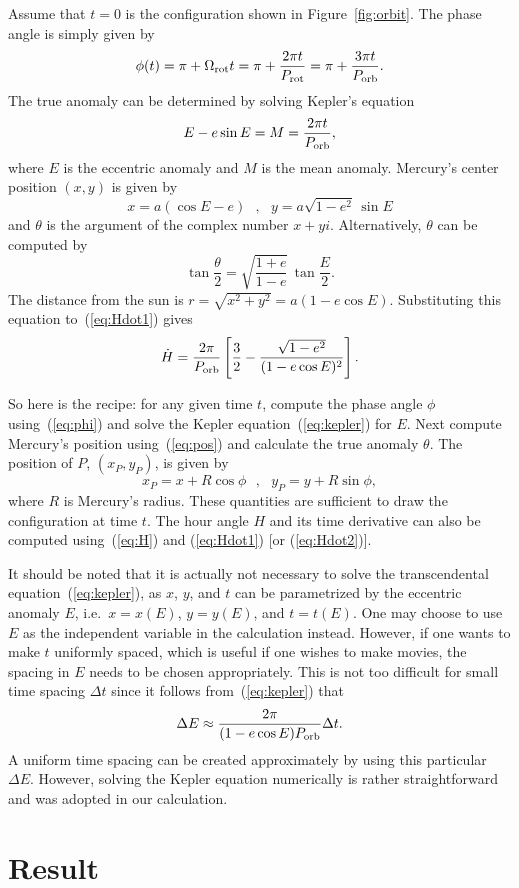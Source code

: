 \documentclass[12pt]{article}
\newcommand \beq {\begin{equation}}
\newcommand \eeq {\end{equation}}
\newcommand{\prot}{P_{\rm rot}}
\newcommand{\porb}{P_{\rm orb}}
\begin{document}
Assume that $t=0$ is the configuration shown in Figure~\ref{fig:orbit}. 
The phase angle is simply given by 
\beq
  \phi(t) = \pi + \Omega_{\rm rot} t = \pi + \frac{2\pi t}{\prot} 
= \pi + \frac{3\pi t}{\porb} .
\label{eq:phi}
\eeq
The true anomaly can be determined by solving Kepler's equation 
\beq
  E - e \sin E = M = \frac{2 \pi t}{\porb} ,
\label{eq:kepler}
\eeq
where $E$ is the eccentric anomaly and $M$ is the mean anomaly. Mercury's 
center position $(x,y)$ is given by 
\beq
  x = a (\cos E - e) \ \ \ , \ \ \ y = a \sqrt{1-e^2}\, \sin E 
\label{eq:pos}
\eeq
and $\theta$ is the argument of the complex number $x+ yi$. Alternatively, 
$\theta$ can be computed by 
\beq
   \tan \frac{\theta}{2} = \sqrt{ \frac{1+e}{1-e}} \, \tan \frac{E}{2} .
\eeq
The distance from the sun is $r=\sqrt{x^2+y^2} = a (1-e \cos E)$. Substituting
this equation to~(\ref{eq:Hdot1}) gives 
\beq
  \dot{H} = \frac{2\pi}{\porb}\left[ \frac{3}{2} - \frac{\sqrt{1-e^2}}{(1-e\cos E)^2} 
\right] .
\label{eq:Hdot2}
\eeq

So here is the recipe: for any given time $t$, compute the phase angle $\phi$ 
using~(\ref{eq:phi}) and solve the Kepler equation~(\ref{eq:kepler}) 
for $E$. Next compute Mercury's position using~(\ref{eq:pos}) and calculate the 
true anomaly $\theta$. The position of $P$, $(x_P,y_P)$, is given by 
\beq
  x_P = x + R \cos \phi \ \ \ , \ \ \ y_P = y + R \sin \phi ,
\eeq
where $R$ is Mercury's radius. These quantities are sufficient to draw 
the configuration at time $t$. The hour angle $H$ and its time 
derivative can also be computed using~(\ref{eq:H}) and (\ref{eq:Hdot1}) 
[or (\ref{eq:Hdot2})].

It should be noted that it is actually not necessary to solve the transcendental 
equation~(\ref{eq:kepler}), as $x$, $y$, and $t$ can be parametrized 
by the eccentric anomaly $E$, i.e.\ $x=x(E)$, $y=y(E)$, and $t=t(E)$. 
One may choose to use $E$ as the independent variable in the calculation 
instead. However, if one wants to make $t$ uniformly spaced, which is 
useful if one wishes to make movies, the spacing in $E$ needs to be 
chosen appropriately. This is not too difficult for small time spacing 
$\Delta t$ since it follows from~(\ref{eq:kepler}) that 
\[
  \Delta E \approx \frac{2 \pi}{(1-e\cos E) \porb} \Delta t .
\]
A uniform time spacing can be created approximately by using
this particular $\Delta E$. However, solving the Kepler equation 
numerically is rather straightforward and was adopted in 
our calculation.

\section{Result}
\end{document}
